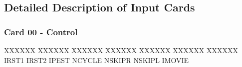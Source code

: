 \subsection{Detailed Description of Input Cards} 
\label{sec:card}
\subsubsection{Card 00 - Control} 
\begin{tabbing} 
XXXXXX \= XXXXXX \= XXXXXX \= XXXXXX \= XXXXXX \= XXXXXX \= XXXXXX
       \\  
\footnotesize IRST1 \>\footnotesize IRST2 \>\footnotesize IPEST \>\footnotesize NCYCLE
\>\footnotesize  NSKIPR \>\footnotesize
NSKIPL \>\footnotesize IMOVIE 
\end{tabbing} 
